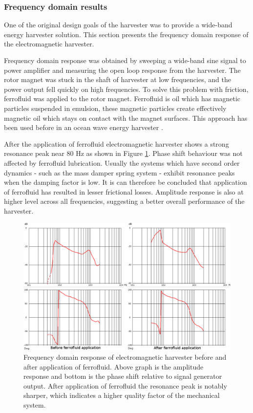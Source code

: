 \subsubsection{Frequency domain results} \label{sect:emh_fd}
One of the original design goals of the harvester was to provide a wide-band energy harvester solution. This section presents the frequency domain response of the electromagnetic harvester.

Frequency domain response was obtained by sweeping a wide-band sine signal to power amplifier and measuring the open loop response from the harvester. The rotor magnet was stuck in the shaft of harvester at low frequencies, and the power output fell quickly on high frequencies. To solve this problem with friction, ferrofluid was applied to the rotor magnet. Ferrofluid is oil which has magnetic particles suspended in emulsion, these magnetic particles create effectively magnetic oil which stays on contact with the magnet surfaces. This approach has been used before in an ocean wave energy harvester \cite{Cheung2009}.

 After the application of ferrofluid electromagnetic harvester shows a strong resonance peak near 80 Hz as shown in Figure \ref{fig:inductive_fd_dry}. Phase shift behaviour was not affected by ferrofluid lubrication. Usually the systems which have second order dynamics - such as the mass damper spring system - exhibit resonance peaks when the damping factor is low. It is can therefore be concluded that application of ferrofluid has resulted in lesser frictional losses. Amplitude response is also at higher level across all frequencies, suggesting a better overall performance of the harvester. 

\begin{figure}[htb]
\begin{center}
\includegraphics[width=\columnwidth]{images/own_measurement/generator_shaker/inductive_fd_combined.png}
\end{center}
\caption{\label{fig:inductive_fd_dry} Frequency domain response of electromagnetic harvester before and after application of ferrofluid. Above graph is the amplitude response and bottom is the phase shift relative to signal generator output. After application of ferrofluid the resonance peak is notably sharper, which indicates a higher quality factor of the mechanical system.}
\end{figure}

